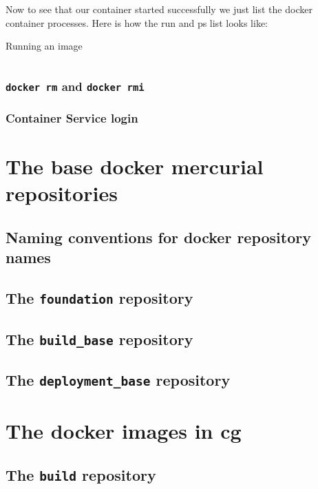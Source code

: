 			Now to see that our container started successfully we just list the docker container processes. Here is how the run and ps list looks like:
			\begin{listing}[H]
				\caption{Running an image}
				\label{lst:p01:ch05:run_image}
				\inputminted{text}{\relative{chapter_04/section_5.1.2/run_image.lst}}
			\end{listing}
			\subsubsection{\texttt{docker rm} and \texttt{docker rmi}}
			\subsubsection{\aws{} Container Service login}\label{p01:ch05:container_service_login}
	\section{The base docker mercurial repositories}\label{p01:ch05:docker_base_repos}
		\subsection{Naming conventions for docker repository names}
		\subsection{The \texttt{foundation} repository}
		\subsection{The \texttt{build\_base} repository}
		\subsection{The \texttt{deployment\_base} repository}
	\section{The docker images in cg}
		\subsection{The \texttt{build} repository}

